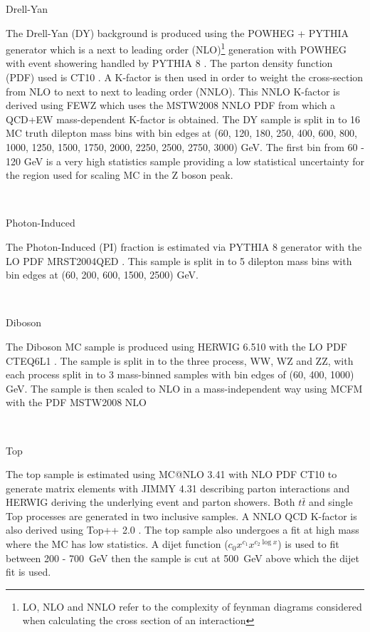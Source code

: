    {\bf\raggedright Drell-Yan}

   {\raggedright The Drell-Yan (DY) background is produced using the POWHEG + PYTHIA generator which is a next to leading order (NLO)\footnote{LO, NLO and NNLO refer to the complexity of feynman diagrams considered when calculating the cross section of an interaction} generation with POWHEG \cite{Alioli:2010xd,Alioli:2008gx} with event showering handled by PYTHIA 8 \cite{Sjostrand:2007gs}. The parton density function (PDF) used is CT10 \cite{Lai:2010vv}. A K-factor is then used in order to weight the cross-section from NLO to next to next to leading order (NNLO). This NNLO K-factor is derived using FEWZ \cite{Gavin:2010az} which uses the MSTW2008 NNLO PDF \cite{Martin:2009iq} from which a QCD+EW mass-dependent K-factor is obtained. The DY sample is split in to 16 MC truth dilepton mass bins with bin edges at (60, 120, 180, 250, 400, 600, 800, 1000, 1250, 1500, 1750, 2000, 2250, 2500, 2750, 3000) GeV. The first bin from 60 - 120 GeV is a very high statistics sample providing a low statistical uncertainty for the region used for scaling MC in the Z boson peak.} \\


   {\bf\raggedright Photon-Induced}

   {\raggedright The Photon-Induced (PI) fraction is estimated via PYTHIA 8 \cite{Sjostrand:2007gs} generator with the LO PDF MRST2004QED \cite{Martin:2004dh}. This sample is split in to 5 dilepton mass bins with bin edges at (60, 200, 600, 1500, 2500) GeV.}\\


   {\bf\raggedright Diboson}

   {\raggedright The Diboson MC sample is produced using HERWIG 6.510 \cite{Corcella:2002jc} with the LO PDF CTEQ6L1 \cite{Pumplin:2002vw}. The sample is split in to the three process, WW, WZ and ZZ, with each process split in to 3 mass-binned samples with bin edges of (60, 400, 1000) GeV. The sample is then scaled to NLO in a mass-independent way using MCFM \cite{Campbell:2010ff} with the PDF MSTW2008 NLO \cite{Martin:2009iq}}\\

   {\bf\raggedright Top}

   {\raggedright The top sample is estimated using MC@NLO 3.41 \cite{Frixione:2008ym} with NLO PDF CT10 \cite{Lai:2010vv} to generate matrix elements with JIMMY 4.31 \cite{Butterworth:1996zw} describing parton interactions and HERWIG \cite{Corcella:2002jc} deriving the underlying event and parton showers. Both $t\bar{t}$ and single Top processes are generated in two inclusive samples. A NNLO QCD K-factor is also derived using Top++ 2.0 \cite{Czakon:2013goa,Cacciari:2011hy}. The top sample also undergoes a fit at high mass where the MC has low statistics. A dijet function ($c_{0}x^{c_{1}} x^{c_{2}\log{x}}$) is used to fit between 200 - 700~GeV then the sample is cut at 500~GeV above which the dijet fit is used.}


